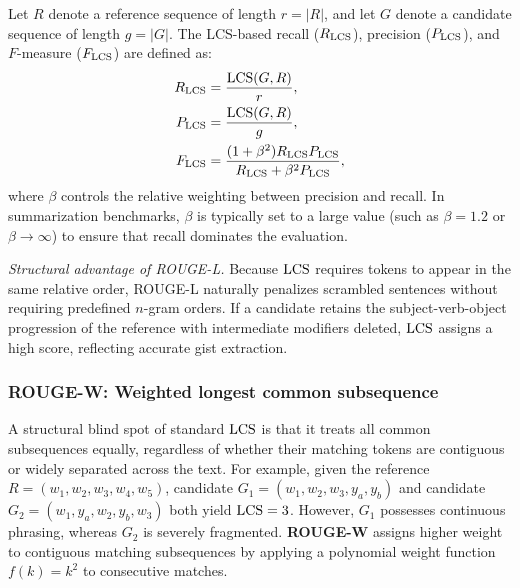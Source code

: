 \documentclass[../../main.tex]{subfiles}
\begin{document}
Let $R$ denote a reference sequence of length $r = |R|$, and let $G$ denote a candidate sequence of length $g = |G|$. The LCS-based recall ($R_{\operatorname{LCS}}$), precision ($P_{\operatorname{LCS}}$), and $F$-measure ($F_{\operatorname{LCS}}$) are defined as:
\begin{align}
\label{eq:rouge_l_recall}
R_{\operatorname{LCS}} &= \frac{\operatorname{LCS}(G, R)}{r}, \\
\label{eq:rouge_l_precision}
P_{\operatorname{LCS}} &= \frac{\operatorname{LCS}(G, R)}{g}, \\
\label{eq:rouge_l_fmeasure}
F_{\operatorname{LCS}} &= \frac{(1 + \beta^2) R_{\operatorname{LCS}} P_{\operatorname{LCS}}}{R_{\operatorname{LCS}} + \beta^2 P_{\operatorname{LCS}}},
\end{align}
where $\beta$ controls the relative weighting between precision and recall. In summarization benchmarks, $\beta$ is typically set to a large value (such as $\beta = 1.2$ or $\beta \to \infty$) to ensure that recall dominates the evaluation.

\textit{Structural advantage of ROUGE-L.} Because $\operatorname{LCS}$ requires tokens to appear in the same relative order, ROUGE-L naturally penalizes scrambled sentences without requiring predefined $n$-gram orders. If a candidate retains the subject-verb-object progression of the reference with intermediate modifiers deleted, $\operatorname{LCS}$ assigns a high score, reflecting accurate gist extraction.

\subsubsection{ROUGE-W: Weighted longest common subsequence}
A structural blind spot of standard $\operatorname{LCS}$ is that it treats all common subsequences equally, regardless of whether their matching tokens are contiguous or widely separated across the text. For example, given the reference $R = (w_1, w_2, w_3, w_4, w_5)$, candidate $G_1 = (w_1, w_2, w_3, y_a, y_b)$ and candidate $G_2 = (w_1, y_a, w_2, y_b, w_3)$ both yield $\operatorname{LCS} = 3$. However, $G_1$ possesses continuous phrasing, whereas $G_2$ is severely fragmented. \textbf{ROUGE-W} assigns higher weight to contiguous matching subsequences by applying a polynomial weight function $f(k) = k^2$ to consecutive matches.
\end{document}
